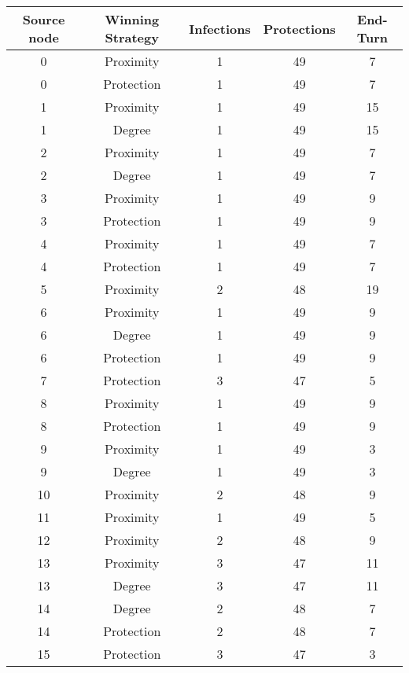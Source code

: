 \documentclass[results.tex]{subfiles}
\begin{document}
\begin{center}
  \begin{tabular}{| c || c | c | c | c |}
    \hline
    {\bfseries Source node} & {\bfseries Winning Strategy} & {\bfseries Infections} & {\bfseries Protections} & {\bfseries End-Turn} \\  %
    \hline\hline
    0 & Proximity & 1 & 49 & 7 \\ 
    \hline
    0 & Protection & 1 & 49 & 7 \\ 
    \hline
    1 & Proximity & 1 & 49 & 15 \\ 
    \hline
    1 & Degree & 1 & 49 & 15 \\ 
    \hline
    2 & Proximity & 1 & 49 & 7 \\ 
    \hline
    2 & Degree & 1 & 49 & 7 \\ 
    \hline
    3 & Proximity & 1 & 49 & 9 \\ 
    \hline
    3 & Protection & 1 & 49 & 9 \\ 
    \hline
    4 & Proximity & 1 & 49 & 7 \\ 
    \hline
    4 & Protection & 1 & 49 & 7 \\ 
    \hline
    5 & Proximity & 2 & 48 & 19 \\ 
    \hline
    6 & Proximity & 1 & 49 & 9 \\ 
    \hline
    6 & Degree & 1 & 49 & 9 \\ 
    \hline
    6 & Protection & 1 & 49 & 9 \\ 
    \hline
    7 & Protection & 3 & 47 & 5 \\ 
    \hline
    8 & Proximity & 1 & 49 & 9 \\ 
    \hline
    8 & Protection & 1 & 49 & 9 \\ 
    \hline
    9 & Proximity & 1 & 49 & 3 \\ 
    \hline
    9 & Degree & 1 & 49 & 3 \\ 
    \hline
    10 & Proximity & 2 & 48 & 9 \\ 
    \hline
    11 & Proximity & 1 & 49 & 5 \\ 
    \hline
    12 & Proximity & 2 & 48 & 9 \\ 
    \hline
    13 & Proximity & 3 & 47 & 11 \\ 
    \hline
    13 & Degree & 3 & 47 & 11 \\ 
    \hline
    14 & Degree & 2 & 48 & 7 \\ 
    \hline
    14 & Protection & 2 & 48 & 7 \\ 
    \hline
    15 & Protection & 3 & 47 & 3 \\ 

\end{tabular}
\end{center}
\end{document}
